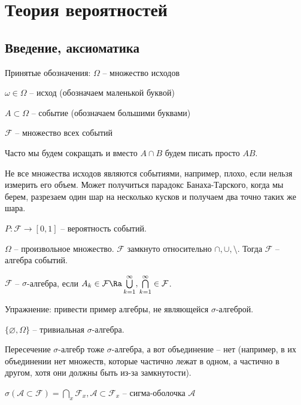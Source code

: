 \chapter{Теория вероятностей}
\section{Введение, аксиоматика}
Принятые обозначения: 
$\Omega$ -- множество исходов

$\omega \in \Omega$ -- исход (обозначаем маленькой буквой)

$A \subset \Omega$ -- событие (обозначаем большими буквами)

$\mathcal{F}$ -- множество всех событий

Часто мы будем сокращать и вместо $A \cap B$ будем писать просто $AB$.

\begin{Rem}
Не все множества исходов являются событиями, например, плохо, если нельзя измерить его объем.
Может получиться парадокс Банаха-Тарского, когда мы берем, разрезаем один шар на несколько кусков и получаем два точно таких же шара.
\end{Rem}

$P: \mathcal{F} \to [0, 1]$ -- вероятность событий.

\begin{Def}
    $\Omega$ -- произвольное множество. $\mathcal{F}$ замкнуто относительно $\cap, \cup, \setminus$. Тогда $\mathcal{F}$ -- алгебра событий.
\end{Def}
\begin{Def}
    $\mathcal{F}$ -- $\sigma$-алгебра, если $A_k \in \mathcal{F} \Ra \bigcup\limits_{k=1}^{\infty}, \bigcap\limits_{k=1}^{\infty} \in \mathcal{F}$.
\end{Def}
Упражнение: привести пример алгебры, не являющейся $\sigma$-алгеброй.
\begin{exmp}
$\{\varnothing, \Omega \}$ -- тривиальная $\sigma$-алгебра.
\end{exmp}

Пересечение $\sigma$-алгебр тоже $\sigma$-алгебра, а вот объединение -- нет 
(например, в их объединении нет множеств, которые частично лежат в одном, а частично в другом, хотя они должны быть из-за замкнутости).

\begin{Def}
    $\sigma(\mathcal{A} \subset \mathcal{F}) = \bigcap\limits_x \mathcal{F}_x, \mathcal{A} \subset \mathcal{F}_x$ -- сигма-оболочка $\mathcal{A}$
\end{Def}

